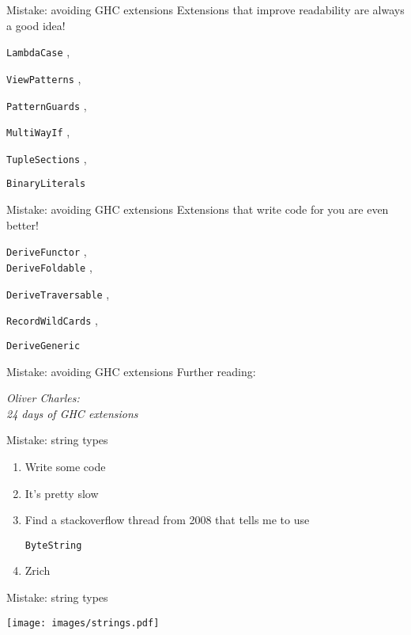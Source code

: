 \documentclass[20pt]{beamer}
\newcommand{\vspaced}{
    \vspace{5mm}
}
\newcommand{\code}[1]{
    \texttt{\small{#1}}
}
\begin{document}
\begin{frame}{Mistake: avoiding GHC extensions}
    Extensions that improve readability are always a good idea! \\
    \vspaced
    \code{LambdaCase},
    \code{ViewPatterns},
    \code{PatternGuards},
    \code{MultiWayIf},
    \code{TupleSections},
    \code{BinaryLiterals}
\end{frame}

\begin{frame}{Mistake: avoiding GHC extensions}
    Extensions that write code for you are even better! \\
    \vspaced
    \code{DeriveFunctor}, \\
    \code{DeriveFoldable},
    \code{DeriveTraversable},
    \code{RecordWildCards},
    \code{DeriveGeneric}
\end{frame}

\begin{frame}{Mistake: avoiding GHC extensions}
    Further reading: \\
    \vspaced
    \emph{Oliver Charles: \\
    24 days of GHC extensions}
\end{frame}


\begin{frame}{Mistake: string types}
    \begin{enumerate}
    \item Write some code
    \item It's pretty slow
    \item Find a stackoverflow thread from 2008 that tells me to use
        \code{ByteString}
    \item Zrich
    \end{enumerate}
\end{frame}

\begin{frame}{Mistake: string types}
    \begin{center}
    \texttt{[image: images/strings.pdf]}
    \end{center}
\end{frame}
\end{document}
